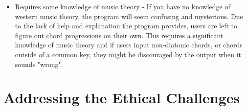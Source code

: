 \documentclass[10pt,twocolumn]{article}
\begin{document}
\begin{itemize}
        \item Requires some knowledge of music theory -
        \newline If you have no knowledge of western music theory, the program will seem confusing and mysterious. Due to the lack of help and explanation the program provides, users are left to figure out chord progressions on their own. This requires a significant knowledge of music theory and if users input non-diatonic chords, or chords outside of a common key, they might be discouraged by the output when it sounds "wrong".
    \end{itemize}

\section{Addressing the Ethical Challenges}
\end{document}
